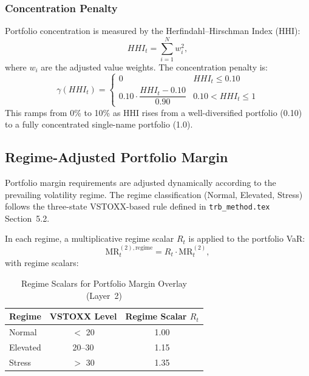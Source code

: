 \documentclass[12pt, a4paper]{article}
\newcommand{\MR}{\mathrm{MR}}
\begin{document}
\subsubsection*{Concentration Penalty}

Portfolio concentration is measured by the Herfindahl--Hirschman Index (HHI):
\begin{equation}
    HHI_t = \sum_{i=1}^{N} w_i^2,
    \label{eq:hhi}
\end{equation}
where $w_i$ are the adjusted value weights. The concentration penalty is:
\begin{equation}
    \gamma(HHI_t) =
    \begin{cases}
        0                                          & HHI_t \leq 0.10 \\[4pt]
        0.10 \cdot \dfrac{HHI_t - 0.10}{0.90}    & 0.10 < HHI_t \leq 1
    \end{cases}
    \label{eq:gamma}
\end{equation}
This ramps from 0\% to 10\% as HHI rises from a well-diversified portfolio
(0.10) to a fully concentrated single-name portfolio (1.0).

\subsection{Regime-Adjusted Portfolio Margin}
\label{subsec:regime_layer2}

Portfolio margin requirements are adjusted dynamically according to the
prevailing volatility regime. The regime classification (Normal, Elevated,
Stress) follows the three-state VSTOXX-based rule defined in
\texttt{trb\_method.tex} Section~5.2.

In each regime, a multiplicative regime scalar $R_t$ is applied to the
portfolio VaR:
\begin{equation}
    \MR_t^{(2),\mathrm{regime}} = R_t \cdot \MR_t^{(2)},
    \label{eq:mr_regime}
\end{equation}
with regime scalars:

\begin{table}[H]
\centering
\caption{Regime Scalars for Portfolio Margin Overlay (Layer~2)}
\label{tab:regime_scalars}
\begin{tabular}{lcc}
\toprule
\textbf{Regime} & \textbf{VSTOXX Level} & \textbf{Regime Scalar $R_t$} \\
\midrule
Normal   & $<$ 20  & 1.00 \\
Elevated & 20--30  & 1.15 \\
Stress   & $>$ 30  & 1.35 \\
\bottomrule
\end{tabular}
\end{table}
\end{document}
